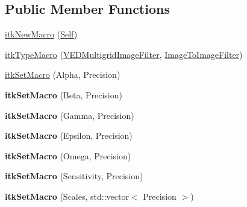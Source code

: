 \subsection*{Public Member Functions}
\begin{DoxyCompactItemize}
\item 
\hyperlink{classitk_1_1_v_e_d_multigrid_image_filter_a20bd54f37685bf1e56408c0391429522}{itk\-New\-Macro} (\hyperlink{classitk_1_1_v_e_d_multigrid_image_filter_a4e79c36d98793a398699ebf672d78762}{Self})
\item 
\hyperlink{classitk_1_1_v_e_d_multigrid_image_filter_a36bb17743677b7b128f4a2daf901d451}{itk\-Type\-Macro} (\hyperlink{classitk_1_1_v_e_d_multigrid_image_filter}{V\-E\-D\-Multigrid\-Image\-Filter}, \hyperlink{class_image_to_image_filter}{Image\-To\-Image\-Filter})
\item 
\hyperlink{classitk_1_1_v_e_d_multigrid_image_filter_aa775d9c3a2d15a5ea172b00dd4958a10}{itk\-Set\-Macro} (Alpha, Precision)
\item 
\hypertarget{classitk_1_1_v_e_d_multigrid_image_filter_a996fbccff298c686a669c10779cc2239}{{\bfseries itk\-Set\-Macro} (Beta, Precision)}\label{classitk_1_1_v_e_d_multigrid_image_filter_a996fbccff298c686a669c10779cc2239}

\item 
\hypertarget{classitk_1_1_v_e_d_multigrid_image_filter_a692d8a063982214189d7f34f0d539318}{{\bfseries itk\-Set\-Macro} (Gamma, Precision)}\label{classitk_1_1_v_e_d_multigrid_image_filter_a692d8a063982214189d7f34f0d539318}

\item 
\hypertarget{classitk_1_1_v_e_d_multigrid_image_filter_aca52dec3af2a2383ef7d8027ea73f5be}{{\bfseries itk\-Set\-Macro} (Epsilon, Precision)}\label{classitk_1_1_v_e_d_multigrid_image_filter_aca52dec3af2a2383ef7d8027ea73f5be}

\item 
\hypertarget{classitk_1_1_v_e_d_multigrid_image_filter_ab8cf92c710c43f11cd587adefd295d8e}{{\bfseries itk\-Set\-Macro} (Omega, Precision)}\label{classitk_1_1_v_e_d_multigrid_image_filter_ab8cf92c710c43f11cd587adefd295d8e}

\item 
\hypertarget{classitk_1_1_v_e_d_multigrid_image_filter_ac2f07dc67d0020cb64e44bdcffb1e2a7}{{\bfseries itk\-Set\-Macro} (Sensitivity, Precision)}\label{classitk_1_1_v_e_d_multigrid_image_filter_ac2f07dc67d0020cb64e44bdcffb1e2a7}

\item 
\hypertarget{classitk_1_1_v_e_d_multigrid_image_filter_a1ddf29473bfa840ffbba4ab726c7921d}{{\bfseries itk\-Set\-Macro} (Scales, std\-::vector$<$ Precision $>$)}\label{classitk_1_1_v_e_d_multigrid_image_filter_a1ddf29473bfa840ffbba4ab726c7921d}


\end{DoxyCompactItemize}

